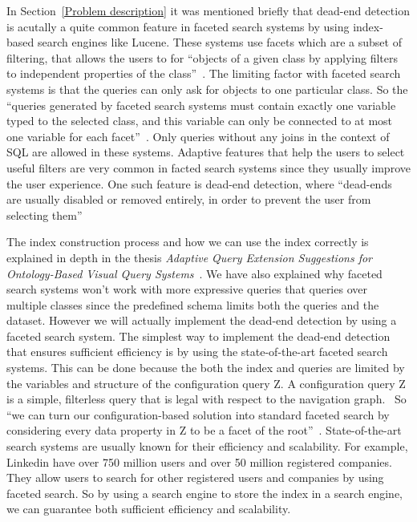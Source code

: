 \documentclass[a4paper,english]{ifimaster/ifimaster}
\begin{document}
In Section~\ref{Problem description} it was mentioned briefly that dead-end detection is acutally a quite common feature in faceted search systems by using index-based search engines like Lucene. These systems use facets which are a subset of filtering, that allows the users to for ``objects of a given class by applying filters to independent properties of the class''~\cite{vidar-phd-2020}. The limiting factor with faceted search systems is that the queries can only ask for objects to one particular class. So the ``queries generated by faceted search systems must contain exactly one variable typed to the selected class, and this variable can only be connected to at most one variable for each facet''~\cite{vidar-phd-2020}. Only queries without any joins in the context of SQL are allowed in these systems. Adaptive features that help the users to select useful filters are very common in facted search systems since they usually improve the user experience. One such feature is dead-end detection, where ``dead-ends are usually disabled or removed entirely, in order to prevent the user from selecting them''~\cite{vidar-phd-2020}

The index construction process and how we can use the index correctly is explained in depth in the thesis \textit{Adaptive Query Extension Suggestions for Ontology-Based Visual Query Systems}~\cite{vidar-phd-2020}. We have also explained why faceted search systems won't work with more expressive queries that queries over multiple classes since the predefined schema limits both the queries and the dataset. However we will actually implement the dead-end detection by using a faceted search system. The simplest way to implement the dead-end detection that ensures sufficient efficiency is by using the state-of-the-art faceted search systems. This can be done because the both the index and queries are limited by the variables and structure of the configuration query Z. A configuration query Z is a simple, filterless query that is legal with respect to the navigation graph.~\cite{vidar-phd-2020} 
So ``we can turn our configuration-based solution into standard faceted search by considering every data property in Z to be a facet of the root''~\cite{vidar-phd-2020}. State-of-the-art search systems are usually known for their efficiency and scalability. For example, Linkedin have over 750 million users and over 50 million registered companies. They allow users to search for other registered users and companies by using faceted search. So by using a search engine to store the index in a search engine, we can guarantee both sufficient efficiency and scalability.
\end{document}
